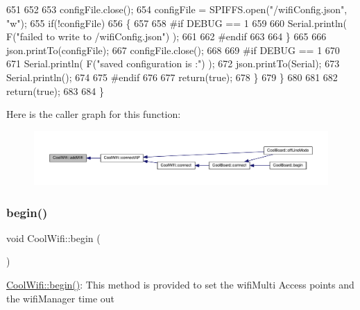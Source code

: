 \begin{DoxyCode}
651             
652 
653             configFile.close();
654             configFile = SPIFFS.open(\textcolor{stringliteral}{"/wifiConfig.json"}, \textcolor{stringliteral}{"w"});
655             \textcolor{keywordflow}{if}(!configFile)
656             \{
657             
658 \textcolor{preprocessor}{            #if DEBUG == 1 }
659 
660                 Serial.println( F(\textcolor{stringliteral}{"failed to write to /wifiConfig.json"}) );
661             
662 \textcolor{preprocessor}{            #endif}
663 
664             \}
665             
666             json.printTo(configFile);
667             configFile.close();
668 
669 \textcolor{preprocessor}{        #if DEBUG == 1 }
670 
671             Serial.println( F(\textcolor{stringliteral}{"saved configuration is :"}) );
672             json.printTo(Serial);
673             Serial.println();
674         
675 \textcolor{preprocessor}{        #endif}
676 
677             \textcolor{keywordflow}{return}(\textcolor{keyword}{true}); 
678         \}
679     \}   
680 
681     
682     \textcolor{keywordflow}{return}(\textcolor{keyword}{true});
683     
684 \}
\end{DoxyCode}
Here is the caller graph for this function\+:\nopagebreak
\begin{figure}[H]
\begin{center}
\leavevmode
\includegraphics[width=350pt]{d7/d29/class_cool_wifi_a914d7a1df14dd6b75345fb614c34e9d6_icgraph}
\end{center}
\end{figure}
\mbox{\label{class_cool_wifi_a46942fed90e475112cc10b78a32e7aaa}} 
\subsubsection{\texorpdfstring{begin()}{begin()}}
{\footnotesize\ttfamily void Cool\+Wifi\+::begin (\begin{DoxyParamCaption}{ }\end{DoxyParamCaption})}

\hyperlink{class_cool_wifi_a46942fed90e475112cc10b78a32e7aaa}{Cool\+Wifi\+::begin()}\+: This method is provided to set the wifi\+Multi Access points and the wifi\+Manager time out 

